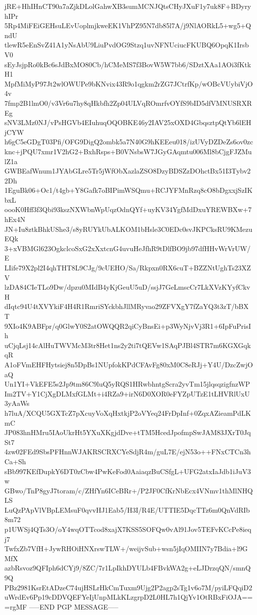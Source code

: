 jRE+HhIHnCT90a7aZjkDLolGahwXB3sumMCNJQtsCHyJXuF1y7uk8F+BDyryhIPr
5Rp4MiFEiGEHsuLEvUoplmjkweEK1VhPZ95N7db85l7A/j9NlAORkL5+wg5+QndU
tlewR5eEnSvZ41A1yNsAbU9LiuPvdOG9Stzq1uvNFNUciucFKUBQ6OpqK1IrsbV0
sEyJsjpRo0kBc6sJdBxMO80Cb/hCMeMS7f3BovW5W7bb6/SDztXAa1AOi3fKtkH1
MpfMiMyP97Jt2wlOWUPe9bKNvix43R9o1qgkm2rZG7JCtrfKp/wOBcVUybiVjO4v
7fmp2B1lmO0/v3Vr6u7hy8qHkbfh2Zp04ULVqROmrfvOYfS9bID5dfVMNUSRXREg
sNV3LMz0NJ/vPsHGVb4EIuhuqOQOBKE46y2IAV25xOXD4GbqsztpQtYb6lEHjCYW
h6gC5eGDgT03Pfi/OFG9DigQ2ombk5a7N40G9hKEEeu018/izUVyDZDeZs6ov0zc
knc+jPQU7xmr1V2hG2+BxhRsps+B0VNsbsW7JGyGAqmtu006Ml8bCjgFJZMulZ1a
GWBEafWnum1JYAbGLre5Tr5jWfObXazlaZSO8DzyBDSZzDOhctBx51I3Tybv22Dh
1EguBk06+Oc1/t4gb+Y8Gafk7oBIPimWSQmu+RCJYFMnRzq8cO8bDgxxjSzIKbxL
oooK0Hff3f3Qbi93kszNXWbnWpUqzOdnQYf+uyKV34YgfMdDxuYREWBXw+7hEx4N
JN+Iu8ztkBhkUShe3/s8yRUYkUbALKOM1bHsle3C0EDc0svJKPCksRU9KMezuEQk
3+xVBMGl623OgkclcoSxG2xXxtcnG4uvuHeJfhR9tDlfBO9jb97dfHHvWrVrUW/E
LIife79X2pl2I4qhTHT8L9CJg/9cUEHO/Sa/Rkpxn0RX6cuT+BZZNtUghTs23XZV
lzDA84CIeTLo9Dw/dpzu0MIdB4yKjGeuU5uD/ssjJ7GeLmscCr7LkXVzKYyfCkvH
dIqtc94U4tXVYkiF4H4R1RmriSYckbhJllMRyvao29ZFVXgY7fZaYQ3t3zT/bBXT
9XIo4K9ABFpr/q0GlwY0S2atOWQQR2qiCyBnsEi+p3WyNjvVj3R1+6IpFuPrisIh
uCjqLsj14cAlHuTWVMcM3tr8Het1ns2y2ti7tQEVw1SAqPJBl4STR7m6KGXGqkqR
A1oFVmEHFHytsiej8n5DpBs1NUpfokKPdCFAvFg80xM0C8eRJj+Y4U/DzcZwjOaQ
Un1YI+VkEFE5s2Jp9tm86C9luQ5yRQS1HRwbhntgScra2yvTm15jlqsqzigfnzWP
Im2TV+Y1CjXgDLMxfGLMt+i4RZa9+irN6D0XOR0eFYZpUTzE1tLHVRlUxU3yAaWs
h7luA/XCQU5GXTcZ7pXcuyVoXqHxtkjP2oVYeq24FrDpInf+0ZqxAZieamPdLKmC
JP083hnHMru5IAoUkrHt5YXuXKgjdDve+tTM5HcedJpofmpSwJAM83JXrT0JqSt7
4zw02FEd9SbsPFHnnWJAKRSCRXCYeSdjR4m/guL7E/ejN53o++FNxCTCn3hCa+Sh
sBb997KEfDupkY6DT0zCbw4PwKeFod0AaiaqzBuCSfgL+UFG2atxIaJdb1iJuV3w
GBwo/TnP8gyJ7toram/c/ZHfYn6ICeBRr+/P2JF0CfKrNbEcx4VNmv1thMlNHQLS
LuQzPApVlVBpLEMsuF0qvvHJ1Eab5/H3I/R4E/UTTIE5DqcTTz6m0QnVdRIb8m72
p1UWSj4QTs3O/oY4wqOTTcod8xajX7KSS5SOFQw0vAl91Jov5TEFvKCcPe8ieqj7
TwfxZb7VfH+JywRHOiHNXrswTLW+/weijvSub+wsn5jIqOMIIN7y7Bdia+l9GMfX
azbRsvoz9QFIph6dCYj9/8ZC/7r1LpIkhDYULb4FBvkWA2g+eLJDrzqQN/smnQ9Q
PBz2981KsrEtADzeC74ujHSLrHkCmTuxm9Ujg2P2agp2sTg1v6o7M/pyiLFQqiD2
uWrdEv6Pp19cDDVQEFYeIjUnpMLkKLzgrpD2L0HL7h1QjYv1OtRBxFiOJA==
=rgMF
-----END PGP MESSAGE-----
